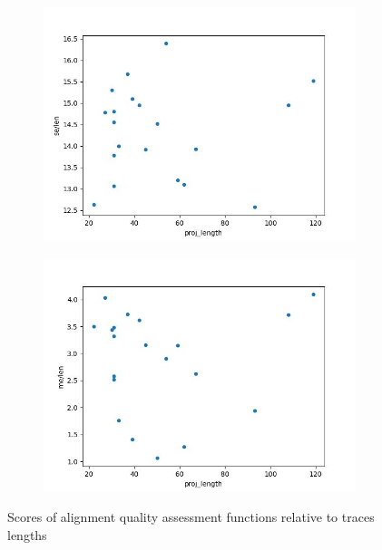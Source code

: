 \documentclass[12pt,a4paper]{article}
\begin{document}
\begin{figure}[H]
\begin{subfigure}[t]{0.5\linewidth}
		\includegraphics[width=1\linewidth]{plots/lenVSselen.jpg}
		\caption{}
		\label{sub:graph5}	
	\end{subfigure}
	\begin{subfigure}[t]{0.5\linewidth}
		\centering
		\includegraphics[width=1\linewidth]{plots/lenVSmelen.jpg}
		\caption{}
		\label{sub:graph6}	
	\end{subfigure}
	\caption{Scores of alignment quality assessment functions relative to traces lengths}
	\label{fig:graphs}
\end{figure}
\end{document}
